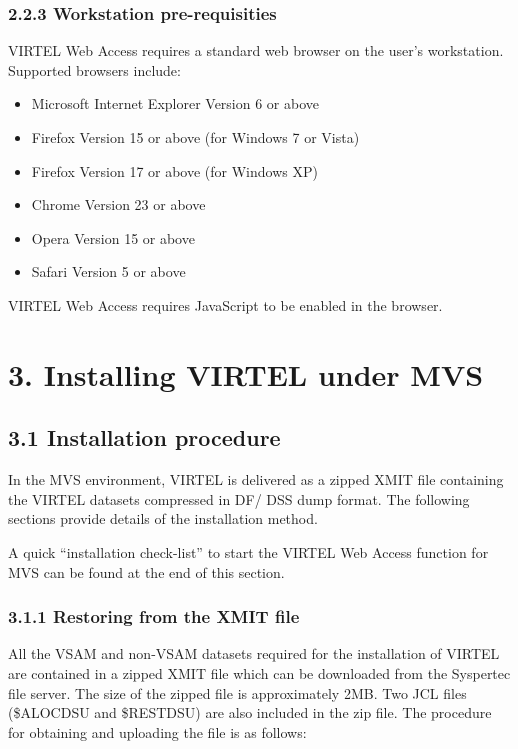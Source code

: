 \documentclass[letterpaper,10pt,english]{sphinxmanual}
\begin{document}
\subsection{2.2.3 Workstation pre-requisities}
\label{\detokenize{Installation_Guide:workstation-pre-requisities}}
VIRTEL Web Access requires a standard web browser on the user’s workstation. Supported browsers include:
\begin{itemize}
\item {} 
Microsoft Internet Explorer Version 6 or above

\item {} 
Firefox Version 15 or above (for Windows 7 or Vista)

\item {} 
Firefox Version 17 or above (for Windows XP)

\item {} 
Chrome Version 23 or above

\item {} 
Opera Version 15 or above

\item {} 
Safari Version 5 or above

\end{itemize}

VIRTEL Web Access requires JavaScript to be enabled in the browser.


\chapter{3. Installing VIRTEL under MVS}
\label{\detokenize{Installation_Guide:v457ig-installmvs}}\label{\detokenize{Installation_Guide:installing-virtel-under-mvs}}

\section{3.1 Installation procedure}
\label{\detokenize{Installation_Guide:installation-procedure}}
In the MVS environment, VIRTEL is delivered as a zipped XMIT file containing the VIRTEL datasets compressed in DF/ DSS dump format. The following sections provide details of the installation method.

A quick “installation check-list” to start the VIRTEL Web Access function for MVS can be found at the end of this section.


\subsection{3.1.1 Restoring from the XMIT file}
\label{\detokenize{Installation_Guide:restoring-from-the-xmit-file}}
All the VSAM and non-VSAM datasets required for the installation of VIRTEL are contained in a zipped XMIT file which can be downloaded from the Syspertec file server. The size of the zipped file is approximately 2MB. Two JCL files (\$ALOCDSU and \$RESTDSU) are also     included in the zip file. The procedure for obtaining and uploading the file is as follows:
\end{document}
